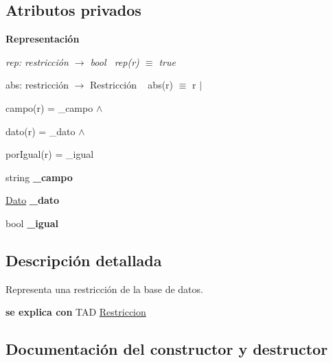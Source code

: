 \subsection*{Atributos privados}
\begin{Indent}\textbf{ Representación}\par
{\em rep\+: restricción $\to$ bool~\newline
rep(r) $\equiv$ true

abs\+: restricción $\to$ Restricción ~\newline
abs(r) $\equiv$ r\textquotesingle{} $|$
\begin{DoxyItemize}
\item campo(r\textquotesingle{}) = \+\_\+campo $\land$
\item dato(r\textquotesingle{}) = \+\_\+dato $\land$
\item por\+Igual(r\textquotesingle{}) = \+\_\+igual 
\end{DoxyItemize}}\begin{DoxyCompactItemize}
\item 
\mbox{\label{classRestriccion_a30dff6c0b92a829c82905d01c034fdf4}} 
string {\bfseries \+\_\+campo}
\item 
\mbox{\label{classRestriccion_a1052448653d6cb5f14537e432b20983c}} 
\mbox{\hyperlink{classDato}{Dato}} {\bfseries \+\_\+dato}
\item 
\mbox{\label{classRestriccion_ac7f162378d50128fc313c811ff40266b}} 
bool {\bfseries \+\_\+igual}
\end{DoxyCompactItemize}
\end{Indent}


\subsection{Descripción detallada}
Representa una restricción de la base de datos. 

{\bfseries se explica con} T\+AD \mbox{\hyperlink{classRestriccion}{Restriccion}} 

\subsection{Documentación del constructor y destructor}
\mbox{\label{classRestriccion_a6a2bb9363d1083319784caec16d9c47f}} 
